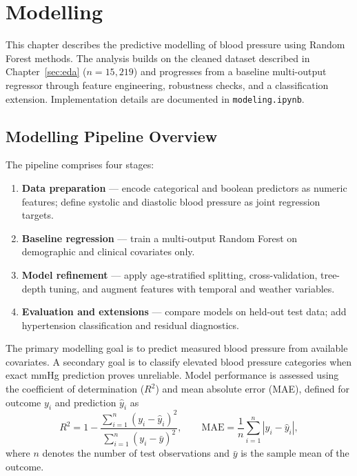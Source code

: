 \chapter{Modelling}
\label{sec:modelling}

This chapter describes the predictive modelling of blood pressure using Random Forest methods. The analysis builds on the cleaned dataset described in Chapter~\ref{sec:eda} ($n = 15{,}219$) and progresses from a baseline multi-output regressor through feature engineering, robustness checks, and a classification extension. Implementation details are documented in \texttt{modeling.ipynb}.

\section{Modelling Pipeline Overview}
\label{sec:modelling_overview}

The pipeline comprises four stages:
\begin{enumerate}
    \item \textbf{Data preparation} --- encode categorical and boolean predictors as numeric features; define systolic and diastolic blood pressure as joint regression targets.
    \item \textbf{Baseline regression} --- train a multi-output Random Forest on demographic and clinical covariates only.
    \item \textbf{Model refinement} --- apply age-stratified splitting, cross-validation, tree-depth tuning, and augment features with temporal and weather variables.
    \item \textbf{Evaluation and extensions} --- compare models on held-out test data; add hypertension classification and residual diagnostics.
\end{enumerate}

The primary modelling goal is to predict measured blood pressure from available covariates. A secondary goal is to classify elevated blood pressure categories when exact mmHg prediction proves unreliable. Model performance is assessed using the coefficient of determination ($R^2$) and mean absolute error (MAE), defined for outcome $y_i$ and prediction $\hat{y}_i$ as
\begin{equation}
    R^2 = 1 - \frac{\sum_{i=1}^{n}(y_i - \hat{y}_i)^2}{\sum_{i=1}^{n}(y_i - \bar{y})^2},
    \qquad
    \mathrm{MAE} = \frac{1}{n}\sum_{i=1}^{n}\left|y_i - \hat{y}_i\right|,
    \label{eq:metrics}
\end{equation}
where $n$ denotes the number of test observations and $\bar{y}$ is the sample mean of the outcome.

